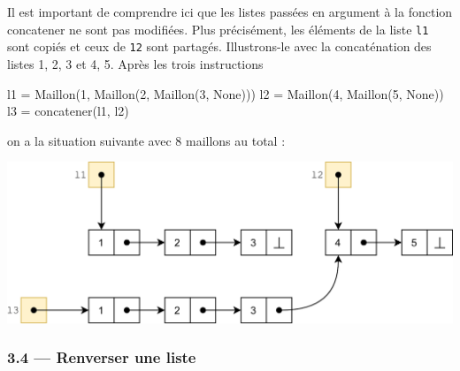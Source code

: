 \documentclass[a4paper,17pt]{extarticle}
\let\origfigure\figure
\let\endorigfigure\endfigure
\renewenvironment{figure}[1][2] {
    \expandafter\origfigure\expandafter[H]
} {
    \endorigfigure
}
\newenvironment{Shaded}{}{}
\newcommand{\DecValTok}[1]{\textcolor[rgb]{0.25,0.63,0.44}{{#1}}}
\newcommand{\NormalTok}[1]{{#1}}
\newcommand{\VariableTok}[1]{\textcolor[rgb]{0.10,0.09,0.49}{{#1}}}
\newcommand{\OperatorTok}[1]{\textcolor[rgb]{0.40,0.40,0.40}{{#1}}}
\begin{document}
\begin{reponse}
        \end{reponse}\begin{remarque}
    Il est important de comprendre ici que les listes passées en argument à
la fonction concatener ne sont pas modifiées. Plus précisément, les
éléments de la liste \texttt{l1} sont copiés et ceux de \texttt{12} sont
partagés. Illustrons-le avec la concaténation des listes 1, 2, 3 et 4,
5. Après les trois instructions

\begin{Shaded}
\begin{Highlighting}[]
\NormalTok{l1 }\OperatorTok{=}\NormalTok{ Maillon(}\DecValTok{1}\NormalTok{, Maillon(}\DecValTok{2}\NormalTok{, Maillon(}\DecValTok{3}\NormalTok{, }\VariableTok{None}\NormalTok{)))}
\NormalTok{l2 }\OperatorTok{=}\NormalTok{ Maillon(}\DecValTok{4}\NormalTok{, Maillon(}\DecValTok{5}\NormalTok{, }\VariableTok{None}\NormalTok{))}
\NormalTok{l3 }\OperatorTok{=}\NormalTok{ concatener(l1, l2)}
\end{Highlighting}
\end{Shaded}

on a la situation suivante avec 8 maillons au total :

\begin{figure}
\centering
\includegraphics{maillon4.png}
\caption{concaténation de deux listes}
\end{figure}

        \end{remarque}
    \hypertarget{renverser-une-liste}{%
\subsubsection{3.4 --- Renverser une liste}\label{renverser-une-liste}}
\end{document}
